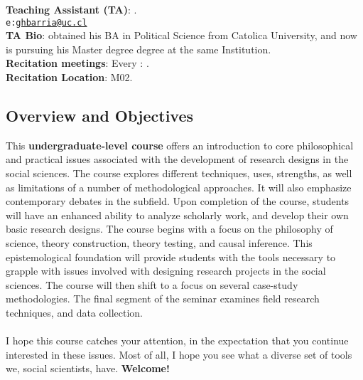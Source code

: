 \documentclass[letterpaper]{article}
\begin{document}
\vspace{0.5cm}
{\bf Teaching Assistant (TA)}: {\unskip}.\\
\texttt{e:}\href{mailto:ghbarria@uc.cl}{\texttt{ghbarria@uc.cl}}\\
{\bf TA Bio}: {\unskip} obtained his BA in Political Science from Catolica University, and now is pursuing his Master degree degree at the same Institution.\\
{\bf Recitation meetings}: Every {\unskip}: {\unskip}.\\
{\bf Recitation Location}: M02.\\



\subsection*{Overview and Objectives}

This {\bf {\color{blue}undergraduate-level course}} offers an introduction to core philosophical and practical issues associated with the development of research designs in the social sciences. The course explores different techniques, uses, strengths, as well as limitations of a number of methodological approaches. It will also emphasize contemporary debates in the subfield. Upon completion of the course, students will have an enhanced ability to analyze scholarly work, and develop their own basic research designs. The course begins with a focus on the philosophy of science, theory construction, theory testing, and causal inference. This epistemological foundation will provide students with the tools necessary to grapple with issues involved with designing research projects in the social sciences. The course will then shift to a focus on several case-study methodologies. The final segment of the seminar examines field research techniques, and data collection.
\\
\\
I hope this course catches your attention, in the expectation that you continue interested in these issues. Most of all, I hope you see what a diverse set of tools we, social scientists, have. {\bf Welcome!}
\end{document}
